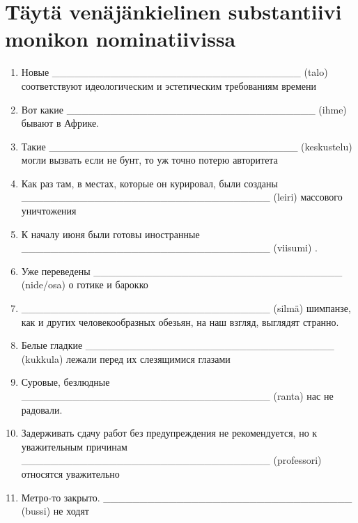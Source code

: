 \documentclass[paper=a4, fontsize=11pt]{scrartcl}
\begin{document}
\clearpage

\section{Täytä venäjänkielinen substantiivi monikon nominatiivissa}

\begin{enumerate}
    \item Новые  __________________________________ (talo) соответствуют идеологическим и эстетическим требованиям времени
    \item Вот какие  __________________________________ (ihme) бывают в Африке. 
    \item Такие  __________________________________ (keskustelu)  могли вызвать если не бунт, то уж точно потерю авторитета
    \item Как раз там, в местах, которые он курировал, были созданы  __________________________________ (leiri) массового уничтожения
    \item К началу июня были готовы иностранные  __________________________________ (viisumi) . 
    \item Уже переведены  __________________________________ (nide/osa)  о готике и барокко
    \item  __________________________________ (silmä) шимпанзе, как и других человекообразных обезьян, на наш взгляд, выглядят странно.
    \item Белые гладкие  __________________________________ (kukkula)  лежали перед их слезящимися глазами
    \item  Суровые, безлюдные  __________________________________ (ranta)  нас не радовали.
    \item Задерживать сдачу работ без предупреждения не рекомендуется, но к уважительным причинам  __________________________________ (professori)  относятся уважительно
    \item Метро-то закрыто.  __________________________________ (bussi)  не ходят
\end{enumerate}
\end{document}
